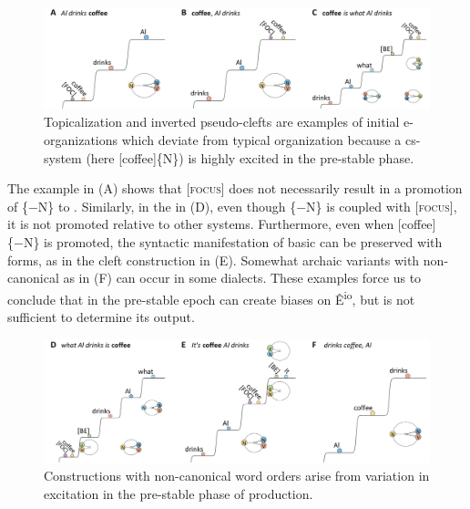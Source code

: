   
\begin{figure}
\includegraphics[width=\textwidth]{figures/Tilsen-img78.png}
\caption{Topicalization and inverted pseudo-clefts are examples of initial e-organizations which deviate from typical organization because a cs-system (here [coffee]\{N\}) is highly excited in the pre-stable phase.}
\label{fig:4:28}
\end{figure}
 

  The example in {}(A) shows that [\textsc{focus}] does not necessarily result in a promotion of \{−N\} to . Similarly, in the  in (D), even though \{−N\} is coupled with [\textsc{focus}], it is not promoted relative to other systems. Furthermore, even when [coffee]\{−N\} is promoted, the syntactic manifestation of basic  can be preserved with  forms, as in the cleft construction in {}(E). Somewhat archaic variants with non-canonical  as in (F) can occur in some dialects. These examples force us to conclude that  in the pre-stable epoch can create biases on Ê\textsuperscript{io}, but  is not sufficient to determine its output. 

  
\begin{figure}
\includegraphics[width=\textwidth]{figures/Tilsen-img79.png}
\caption{Constructions with non-canonical word orders arise from variation in excitation in the pre-stable phase of production.}
\label{fig:4:29}
\end{figure}
 

